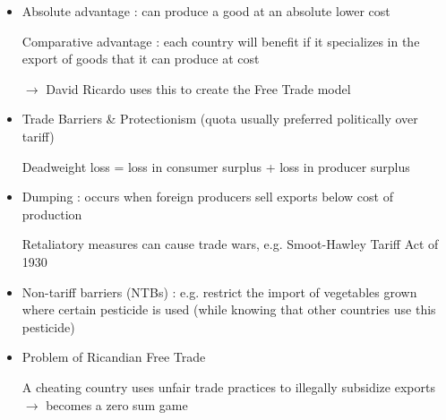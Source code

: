 \documentclass{article}
\begin{document}
\newpage
{}
\begin{itemize}
\item Absolute advantage : can produce a good at an absolute lower cost

{\color{red} Comparative advantage} : each country will benefit if it specializes in the export of goods that it can produce at  cost

$\rightarrow$ David Ricardo uses this to create the Free Trade model

\item Trade Barriers \& Protectionism (quota usually preferred politically over tariff)

Deadweight loss = loss in consumer surplus + loss in producer surplus

\item Dumping : occurs when foreign producers sell exports below cost of production

Retaliatory measures can cause trade wars, e.g. Smoot-Hawley Tariff Act of 1930

\item Non-tariff barriers (NTBs) : e.g. restrict the import of vegetables grown where certain pesticide is used (while knowing that other countries use this pesticide)

\item Problem of Ricandian Free Trade

A cheating country uses unfair trade practices to illegally subsidize exports $\rightarrow$ becomes a zero sum game
\end{itemize}
\end{document}
